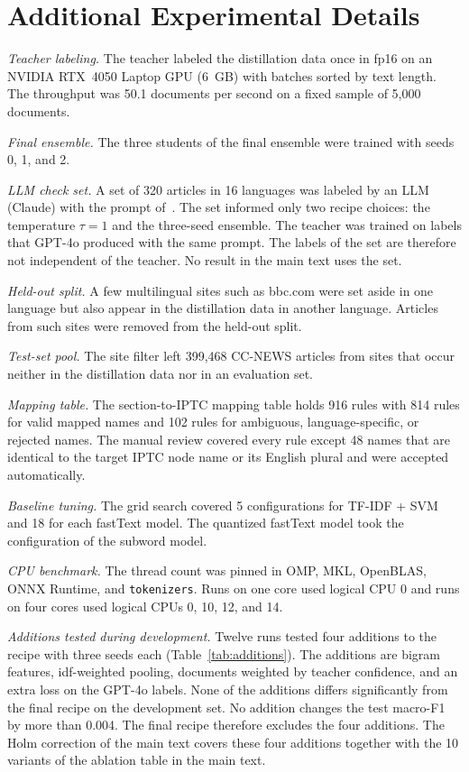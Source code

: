 \documentclass[journal,onecolumn]{IEEEtran}
\begin{document}
\section*{Additional Experimental Details}
\textit{Teacher labeling.} The teacher labeled the distillation data once in fp16 on an NVIDIA RTX~4050 Laptop GPU (6~GB) with batches sorted by text length. The throughput was 50.1 documents per second on a fixed sample of 5,000 documents.

\textit{Final ensemble.} The three students of the final ensemble were trained with seeds 0, 1, and 2.

\textit{LLM check set.} A set of 320 articles in 16 languages was labeled by an LLM (Claude) with the prompt of~\cite{kuzman2025llm}. The set informed only two recipe choices: the temperature $\tau=1$ and the three-seed ensemble. The teacher was trained on labels that GPT-4o produced with the same prompt. The labels of the set are therefore not independent of the teacher. No result in the main text uses the set.

\textit{Held-out split.} A few multilingual sites such as bbc.com were set aside in one language but also appear in the distillation data in another language. Articles from such sites were removed from the held-out split.

\textit{Test-set pool.} The site filter left 399,468 CC-NEWS articles from sites that occur neither in the distillation data nor in an evaluation set.

\textit{Mapping table.} The section-to-IPTC mapping table holds 916 rules with 814 rules for valid mapped names and 102 rules for ambiguous, language-specific, or rejected names. The manual review covered every rule except 48 names that are identical to the target IPTC node name or its English plural and were accepted automatically.

\textit{Baseline tuning.} The grid search covered 5 configurations for TF-IDF + SVM and 18 for each fastText model. The quantized fastText model took the configuration of the subword model.

\textit{CPU benchmark.} The thread count was pinned in OMP, MKL, OpenBLAS, ONNX Runtime, and \texttt{tokenizers}. Runs on one core used logical CPU 0 and runs on four cores used logical CPUs 0, 10, 12, and 14.

\textit{Additions tested during development.} Twelve runs tested four additions to the recipe with three seeds each (Table~\ref{tab:additions}). The additions are bigram features, idf-weighted pooling, documents weighted by teacher confidence, and an extra loss on the GPT-4o labels. None of the additions differs significantly from the final recipe on the development set. No addition changes the test macro-F1 by more than 0.004. The final recipe therefore excludes the four additions. The Holm correction of the main text covers these four additions together with the 10 variants of the ablation table in the main text.
\end{document}
